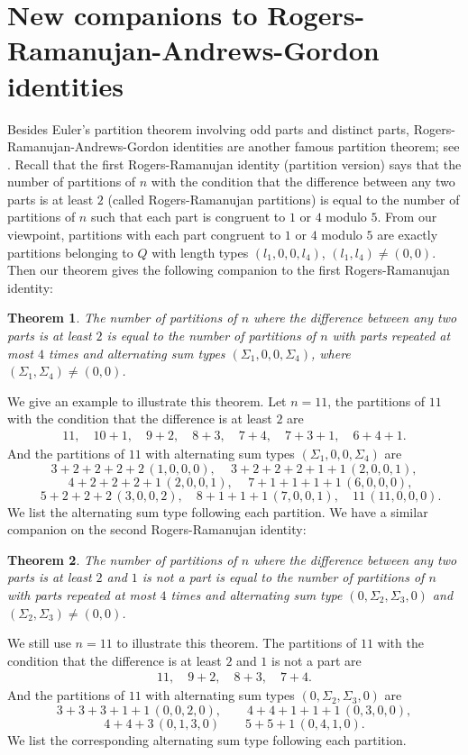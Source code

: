 \documentclass[11pt]{article}
\newtheorem{theorem}{Theorem}[section]
\begin{document}
\section{New companions to Rogers-Ramanujan-Andrews-Gordon identities}

Besides Euler's partition theorem involving odd parts and distinct parts, Rogers-Ramanujan-Andrews-Gordon identities are another famous partition theorem; see \cite{AlladiBerkovich2, AndrewsRR, Ber-peter, Bressoud}. Recall that the first Rogers-Ramanujan identity (partition version) says that the number of partitions of $n$ with the condition that the difference between any two parts is at least $2$ (called Rogers-Ramanujan partitions) is equal to the number of partitions of $n$ such that each part is congruent to $1$ or $4$ modulo $5$. From our viewpoint, partitions with each part congruent to $1$ or $4$ modulo $5$ are exactly partitions belonging to $Q$ with length types $(l_{1},0, 0, l_{4})$, $(l_{1},l_{4})\neq (0,0)$. Then our theorem gives the following companion to the first Rogers-Ramanujan identity:
\begin{theorem}
The number of partitions of $n$ where the difference between any two parts is at least
$2$ is equal to the number of partitions of $n$ with parts repeated  at most $4$ times and alternating sum types $(\Sigma_{1},0,0,\Sigma_{4})$,  where $(\Sigma_{1}, \Sigma_{4})\neq (0,0)$.
\end{theorem}
We give an example to illustrate this theorem. Let $n=11$, the partitions of $11$ with the condition that the difference is at least
$2$ are
\begin{align*}
11,\quad 10+1,\quad 9+2,\quad 8+3, \quad
7+4, \quad 7+3+1,\quad 6+4+1.
\end{align*}
And the partitions of $11$ with alternating sum types $(\Sigma_{1},0,0,\Sigma_{4})$ are 
$$3+2+2+2+2\,(1,0,0,0),\quad \,3+2+2+2+1+1\,(2,0,0,1),$$
$$\quad 4+2+2+2+1\,(2,0,0,1), \quad\,7+1+1+1+1\,(6,0,0,0),$$ 
$$\quad    5+2+2+2\,(3,0,0,2),\quad 8+1+1+1\,(7,0,0,1),  \quad 11\,(11,0,0,0).$$
We list the alternating sum type following each partition.
We have a similar companion on the second Rogers-Ramanujan identity:
\begin{theorem}
The number of partitions of $n$ where the difference between any two parts is at least
$2$ and $1$ is not a part is equal to the number of partitions of $n$ with parts repeated at most $4$ times and alternating sum type $(0,\Sigma_{2},\Sigma_{3},0)$ and $(\Sigma_{2}, \Sigma_{3})\neq (0,0)$.
\end{theorem}
We still use $n=11$ to illustrate this theorem.  The partitions of $11$ with the condition that the difference is at least
$2$ and $1$ is not a part are
\begin{align*}
11,\quad 9+2,\quad 8+3,\quad
7+4.
\end{align*}
And the partitions of $11$ with alternating sum types $(0,\Sigma_{2},\Sigma_{3},0)$ are 
$$3+3+3+1+1\,(0,0,2,0),\quad\quad 4+4+1+1+1\,(0,3,0,0),$$
$$ 4+4+3\,(0,1,3,0)\quad\quad 5+5+1\,(0,4,1,0).$$
We list the corresponding alternating sum type following each partition.
\end{document}
